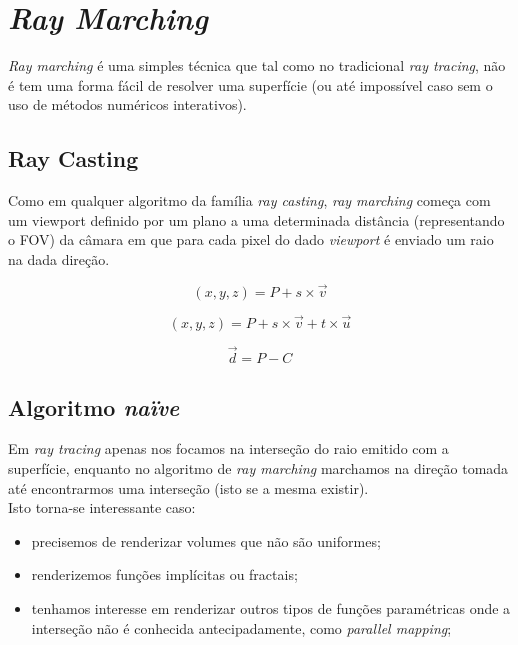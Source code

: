 \section{\emph{Ray Marching}}
\label{sec::arte:raymarch}


\textit{Ray marching} é uma simples técnica que tal como no tradicional \textit{ray tracing}, não é tem uma forma fácil de resolver uma superfície (ou até impossível caso sem o uso de métodos numéricos interativos). 

\subsection{Ray Casting}
Como em qualquer algoritmo da família \textit{ray casting}, \textit{ray marching} começa com um viewport definido por um plano a uma determinada distância (representando o \ac{FOV}) da câmara em que para cada pixel do dado \textit{viewport} é enviado um raio na dada direção.

\begin{equation}
    (x, y, z) = P + s \times \overrightarrow{v}
\end{equation}

\begin{equation}
    (x, y, z) = P + s \times \overrightarrow{v} + t \times \overrightarrow{u}
\end{equation}

\begin{equation}
    \overrightarrow{d} = P - C
\end{equation}




\subsection{Algoritmo \textit{naïve}}
Em \textit{ray tracing} apenas nos focamos na interseção do raio emitido com a superfície, enquanto no algoritmo de \textit{ray marching} marchamos na direção tomada até encontrarmos uma interseção (isto se a mesma existir).\\

Isto torna-se interessante caso:
\begin{itemize}
    \item precisemos de renderizar volumes que não são uniformes;
    \item renderizemos funções implícitas ou fractais;
    \item tenhamos interesse em renderizar outros tipos de funções paramétricas onde a interseção não é conhecida antecipadamente, como \textit{parallel mapping};
\end{itemize}

